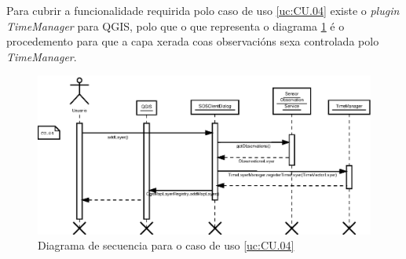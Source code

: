 Para cubrir a funcionalidade requirida polo caso de uso \ref{uc:CU.04} existe o \emph{plugin} \emph{TimeManager} para QGIS, polo que o que representa o diagrama \ref{fig:diaSeq4} é o procedemento para que a capa xerada coas observacións sexa controlada polo \emph{TimeManager}.
\begin{figure}
 \centering
 \includegraphics[width=\textwidth]{images/seq4.eps}
 \caption{Diagrama de secuencia para o caso de uso \ref{uc:CU.04}}
 \label{fig:diaSeq4}
\end{figure}